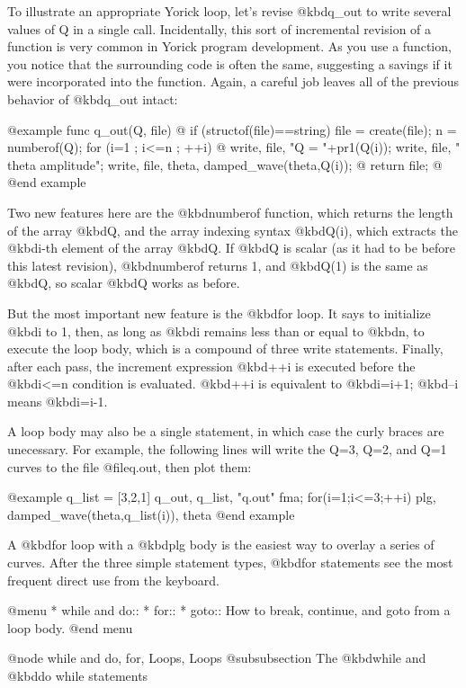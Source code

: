 {To illustrate an appropriate Yorick loop, let's revise @kbd{q_out} to
write several values of Q in a single call.  Incidentally, this sort
of incremental revision of a function is very common in Yorick program
development.  As you use a function, you notice that the surrounding
code is often the same, suggesting a savings if it were incorporated
into the function.  Again, a careful job leaves all of the previous
behavior of @kbd{q_out} intact:

@example
func q_out(Q, file)
@{
  if (structof(file)==string) file = create(file);
  n = numberof(Q);
  for (i=1 ; i<=n ; ++i) @{
    write, file, "Q = "+pr1(Q(i));
    write, file, "   theta       amplitude";
    write, file, theta, damped_wave(theta,Q(i));
  @}
  return file;
@}
@end example

Two new features here are the @kbd{numberof} function, which returns
the length of the array @kbd{Q}, and the array indexing syntax
@kbd{Q(i)}, which extracts the @kbd{i}-th element of the array
@kbd{Q}.  If @kbd{Q} is scalar (as it had to be before this latest
revision), @kbd{numberof} returns 1, and @kbd{Q(1)} is the same as
@kbd{Q}, so scalar @kbd{Q} works as before.

But the most important new feature is the @kbd{for} loop.  It says to
initialize @kbd{i} to 1, then, as long as @kbd{i} remains less than or
equal to @kbd{n}, to execute the loop body, which is a compound of
three write statements.  Finally, after each pass, the increment
expression @kbd{++i} is executed before the @kbd{i<=n} condition is
evaluated.  @kbd{++i} is equivalent to @kbd{i=i+1}; @kbd{--i} means
@kbd{i=i-1}.

A loop body may also be a single statement, in which case the curly
braces are unecessary.  For example, the following lines will write
the Q=3, Q=2, and Q=1 curves to the file @file{q.out}, then plot
them:

@example
q_list = [3,2,1]
q_out, q_list, "q.out"
fma; for(i=1;i<=3;++i) plg, damped_wave(theta,q_list(i)), theta
@end example

A @kbd{for} loop with a @kbd{plg} body is the easiest way to overlay a
series of curves.  After the three simple statement types, @kbd{for}
statements see the most frequent direct use from the keyboard.


@menu
* while and do::                
* for::                         
* goto::                        How to break, continue, and goto from a loop body.
@end menu

@node while and do, for, Loops, Loops
@subsubsection The @kbd{while} and @kbd{do while} statements

}
